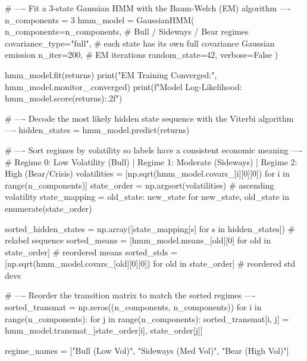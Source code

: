 \begin{codebox}[title={Fit a 3-state Gaussian HMM with the Baum-Welch (EM) algorithm}]
# ---- Fit a 3-state Gaussian HMM with the Baum-Welch (EM) algorithm ----
n_components = 3
hmm_model = GaussianHMM(
    n_components=n_components,        # Bull / Sideways / Bear regimes
    covariance_type="full",           # each state has its own full covariance Gaussian emission
    n_iter=200,                       # EM iterations
    random_state=42,
    verbose=False
)

hmm_model.fit(returns)
print("EM Training Converged:", hmm_model.monitor_.converged)
print(f"Model Log-Likelihood: {hmm_model.score(returns):.2f}")

# ---- Decode the most likely hidden state sequence with the Viterbi algorithm ----
hidden_states = hmm_model.predict(returns)

# ---- Sort regimes by volatility so labels have a consistent economic meaning ----
# Regime 0: Low Volatility (Bull) | Regime 1: Moderate (Sideways) | Regime 2: High (Bear/Crisis)
volatilities = [np.sqrt(hmm_model.covars_[i][0][0]) for i in range(n_components)]
state_order = np.argsort(volatilities)                                           # ascending volatility
state_mapping = {old_state: new_state for new_state, old_state in enumerate(state_order)}

sorted_hidden_states = np.array([state_mapping[s] for s in hidden_states])       # relabel sequence
sorted_means = [hmm_model.means_[old][0] for old in state_order]                 # reordered means
sorted_stds  = [np.sqrt(hmm_model.covars_[old][0][0]) for old in state_order]    # reordered std devs

# ---- Reorder the transition matrix to match the sorted regimes ----
sorted_transmat = np.zeros((n_components, n_components))
for i in range(n_components):
    for j in range(n_components):
        sorted_transmat[i, j] = hmm_model.transmat_[state_order[i], state_order[j]]

regime_names = ["Bull (Low Vol)", "Sideways (Med Vol)", "Bear (High Vol)"]
\end{codebox}

